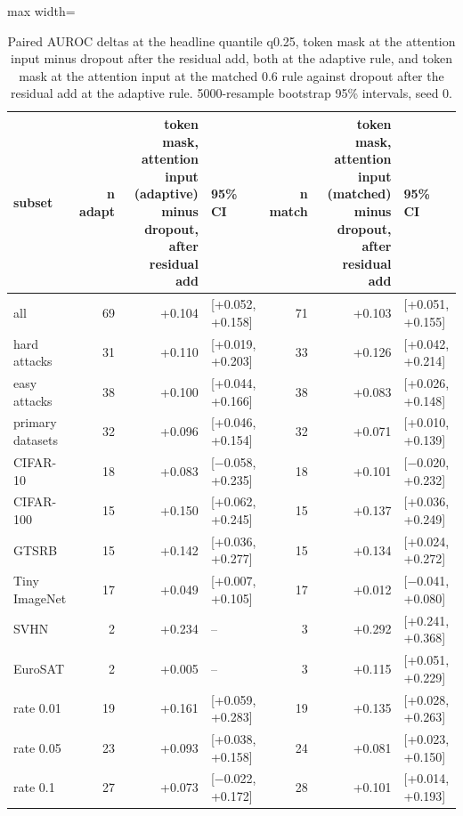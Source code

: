 \begin{table}[htbp]
\centering
\small
\caption{Paired AUROC deltas at the headline quantile q0.25, token mask at the attention input minus dropout after the residual add, both at the adaptive rule, and token mask at the attention input at the matched 0.6 rule against dropout after the residual add at the adaptive rule. 5000-resample bootstrap 95\% intervals, seed 0.}
\label{tab:headline-deltas}
\begin{adjustbox}{max width=\linewidth}
\begin{tabular}{lrrlrrl}
\toprule
subset & n adapt & token mask, attention input (adaptive) minus dropout, after residual add & 95\% CI & n match & token mask, attention input (matched) minus dropout, after residual add & 95\% CI \\
\midrule
all & 69 & +0.104 & [+0.052, +0.158] & 71 & +0.103 & [+0.051, +0.155] \\
hard attacks & 31 & +0.110 & [+0.019, +0.203] & 33 & +0.126 & [+0.042, +0.214] \\
easy attacks & 38 & +0.100 & [+0.044, +0.166] & 38 & +0.083 & [+0.026, +0.148] \\
primary datasets & 32 & +0.096 & [+0.046, +0.154] & 32 & +0.071 & [+0.010, +0.139] \\
CIFAR-10 & 18 & +0.083 & [$-$0.058, +0.235] & 18 & +0.101 & [$-$0.020, +0.232] \\
CIFAR-100 & 15 & +0.150 & [+0.062, +0.245] & 15 & +0.137 & [+0.036, +0.249] \\
GTSRB & 15 & +0.142 & [+0.036, +0.277] & 15 & +0.134 & [+0.024, +0.272] \\
Tiny ImageNet & 17 & +0.049 & [+0.007, +0.105] & 17 & +0.012 & [$-$0.041, +0.080] \\
SVHN & 2 & +0.234 & -- & 3 & +0.292 & [+0.241, +0.368] \\
EuroSAT & 2 & +0.005 & -- & 3 & +0.115 & [+0.051, +0.229] \\
rate 0.01 & 19 & +0.161 & [+0.059, +0.283] & 19 & +0.135 & [+0.028, +0.263] \\
rate 0.05 & 23 & +0.093 & [+0.038, +0.158] & 24 & +0.081 & [+0.023, +0.150] \\
rate 0.1 & 27 & +0.073 & [$-$0.022, +0.172] & 28 & +0.101 & [+0.014, +0.193] \\
\bottomrule
\end{tabular}
\end{adjustbox}
\end{table}
